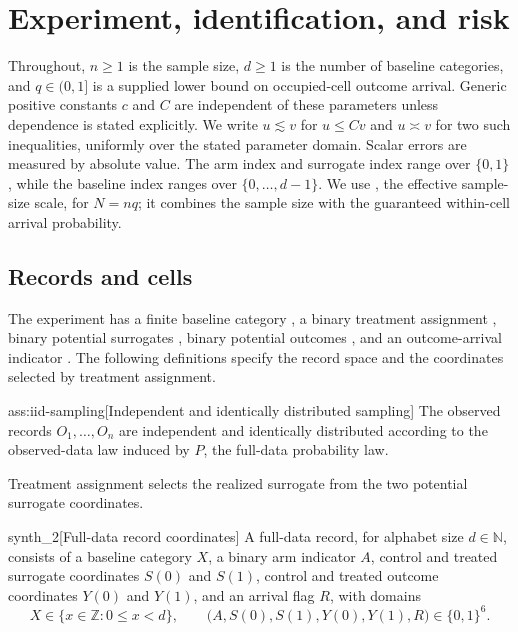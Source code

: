 \section{Experiment, identification, and risk}

Throughout, \(n\ge1\) is the sample size, \(d\ge1\) is the number of baseline categories, and \(q\in(0,1]\) is a supplied lower bound on occupied-cell outcome arrival. Generic positive constants \(c\) and \(C\) are independent of these parameters unless dependence is stated explicitly. We write \(u\lesssim v\) for \(u\le Cv\) and \(u\asymp v\) for two such inequalities, uniformly over the stated parameter domain. Scalar errors are measured by absolute value. The arm index  and surrogate index  range over \(\{0,1\}\), while the baseline index  ranges over \(\{0,\ldots,d-1\}\). We use , the effective sample-size scale, for \(N=nq\); it combines the sample size with the guaranteed within-cell arrival probability.

\subsection{Records and cells}

The experiment has a finite baseline category , a binary treatment assignment , binary potential surrogates , binary potential outcomes , and an outcome-arrival indicator . The following definitions specify the record space and the coordinates selected by treatment assignment.

\begin{assumptionv}{ass:iid-sampling}[Independent and identically distributed sampling]
The observed records \(O_1,\ldots,O_n\) are independent and identically distributed according to the observed-data law induced by \(P\), the full-data probability law.
\end{assumptionv}

Treatment assignment selects the realized surrogate  from the two potential surrogate coordinates.

\begin{definitionv}{synth_2}[Full-data record coordinates]
A full-data record, for alphabet size \(d\in\mathbb N\), consists of a baseline category \(X\), a binary arm indicator \(A\), control and treated surrogate coordinates \(S(0)\) and \(S(1)\), control and treated outcome coordinates \(Y(0)\) and \(Y(1)\), and an arrival flag \(R\), with domains
\[
X\in\{x\in\mathbb Z:0\le x<d\},
\qquad
\bigl(A,S(0),S(1),Y(0),Y(1),R\bigr)\in\{0,1\}^{6}.
\]
\end{definitionv}

